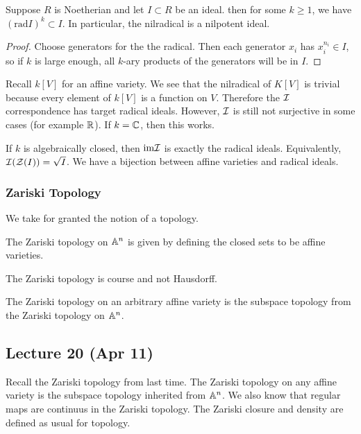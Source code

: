 \documentclass[10pt, twoside]{article}
\begin{document}
    \begin{prop}
        Suppose $R$ is Noetherian and let $I \subset R$ be an ideal. then for some $k \geq 1$, we have $(\mathrm{rad}I)^k \subset I$. In particular, the nilradical is a nilpotent ideal.
        \begin{proof}
            Choose generators for the the radical. Then each generator $x_i$ has $x_i^{n_i} \in I$, so if $k$ is large enough, all $k$-ary products of the generators will be in $I$.
        \end{proof}
    \end{prop}

    Recall $k[V]$ for an affine variety. We see that the nilradical of $K[V]$ is trivial because every element of $k[V]$ is a function on $V$. Therefore the $\mathcal{I}$ correspondence has target radical ideals. However, $\mathcal{I}$ is still not surjective in some cases (for example $\mathbb{R}$). If $k = \mathbb{C}$, then this works.

    \begin{thm}[Nullstellensatz]
        If $k$ is algebraically closed, then $\mathrm{im} \mathcal{I}$ is exactly the radical ideals. Equivalently, $\mathcal{I}(\mathcal{Z}(I)) = \sqrt{I}$. We have a bijection between affine varieties and radical ideals.
    \end{thm}

    \subsubsection{Zariski Topology}
    We take for granted the notion of a topology. 

    \begin{defn}
        The Zariski topology on $\mathbb{A}^n$ is given by defining the closed sets to be affine varieties.
    \end{defn}
    \begin{rmk}
        The Zariski topology is course and not Hausdorff.
    \end{rmk}
    \begin{rmk}
        The Zariski topology on an arbitrary affine variety is the subspace topology from the Zariski topology on $\mathbb{A}^n$.
    \end{rmk}
       
        \subsection{Lecture 20 (Apr 11)}
        Recall the Zariski topology from last time. The Zariski topology on any affine variety is the subspace topology inherited from $\mathbb{A}^n$. We also know that regular maps are continuus in the Zariski topology. The Zariski closure and density are defined as usual for topology.
\end{document}
